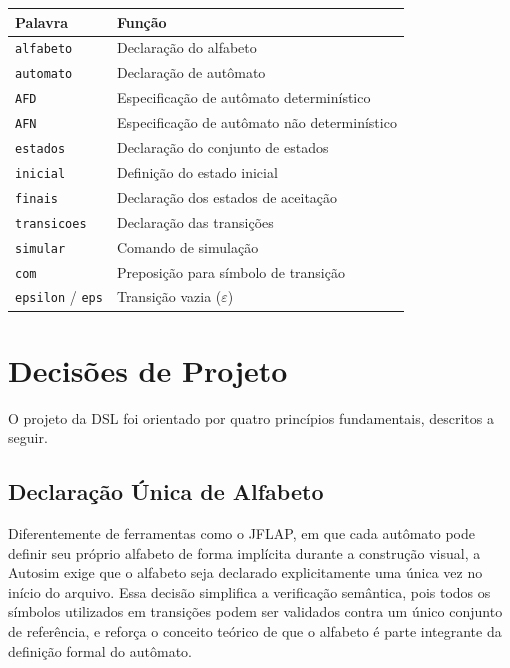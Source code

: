 \documentclass[
    12pt
    ,oneside
    ,a4paper
    ,chapter=TITLE
    ,section=TITLE
    ,sumario=abnt-6027-2012]{abntex2}
\begin{document}
\begin{quadro}[h]
    \centering
    \caption{PALAVRAS RESERVADAS DA DSL AUTOSIM}
    \label{quad:palavras-reservadas}
    \small
    \begin{tabular}{|l|l|}
        \hline
        \textbf{Palavra} & \textbf{Função} \\
        \hline
        \texttt{alfabeto}  & Declaração do alfabeto \\
        \texttt{automato}  & Declaração de autômato \\
        \texttt{AFD}       & Especificação de autômato determinístico \\
        \texttt{AFN}       & Especificação de autômato não determinístico \\
        \texttt{estados}   & Declaração do conjunto de estados \\
        \texttt{inicial}   & Definição do estado inicial \\
        \texttt{finais}    & Declaração dos estados de aceitação \\
        \texttt{transicoes}& Declaração das transições \\
        \texttt{simular}   & Comando de simulação \\
        \texttt{com}       & Preposição para símbolo de transição \\
        \texttt{epsilon} / \texttt{eps} & Transição vazia ($\varepsilon$) \\
        \hline
    \end{tabular}
\end{quadro}

\section{Decisões de Projeto}
\label{sec:dsl-decisoes}

O projeto da DSL foi orientado por quatro princípios fundamentais, descritos a seguir.

\subsection{Declaração Única de Alfabeto}
\label{sec:dsl-alfabeto-unico}

Diferentemente de ferramentas como o JFLAP, em que cada autômato pode definir seu
próprio alfabeto de forma implícita durante a construção visual, a Autosim exige
que o alfabeto seja declarado explicitamente uma única vez no início do arquivo.
Essa decisão simplifica a verificação semântica, pois todos os símbolos utilizados
em transições podem ser validados contra um único conjunto de referência, e
reforça o conceito teórico de que o alfabeto é parte integrante da definição
formal do autômato.
\end{document}
